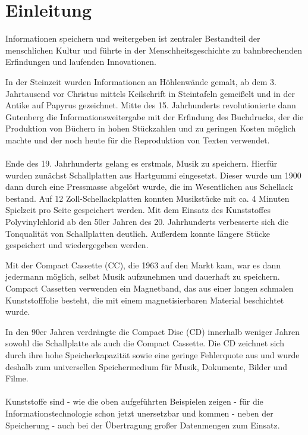 \section{Einleitung}

Informationen speichern und weitergeben ist zentraler Bestandteil der menschlichen Kultur und führte 
in der Menschheitsgeschichte zu bahnbrechenden Erfindungen und laufenden Innovationen.

In der Steinzeit wurden Informationen an Höhlenwände gemalt, ab dem 3. Jahrtausend vor Christus
mittels Keilschrift in Steintafeln gemeißelt und in der Antike auf Papyrus gezeichnet. Mitte
des 15. Jahrhunderts revolutionierte dann Gutenberg die Informationsweitergabe mit der Erfindung des
Buchdrucks, der die Produktion von Büchern in hohen Stückzahlen und zu geringen Kosten möglich
machte und der noch heute für die Reproduktion von Texten verwendet.

\paragraph{}
Ende des 19. Jahrhunderts gelang es erstmals, Musik zu speichern. Hierfür wurden zunächst
Schallplatten aus Hartgummi eingesetzt. Dieser wurde um 1900 dann durch eine Pressmasse abgelöst
wurde, die im Wesentlichen aus Schellack bestand. Auf 12 Zoll-Schellackplatten konnten Musikstücke
mit ca. 4 Minuten Spielzeit pro Seite gespeichert werden. Mit dem Einsatz des Kunststoffes
Polyvinylchlorid ab den 50er Jahren des 20. Jahrhunderts verbesserte sich die Tonqualität von
Schallplatten deutlich. Außerdem konnte längere Stücke gespeichert und wiedergegeben werden.
\cite{schallplatte1}

Mit der Compact Cassette (CC), die 1963 auf den Markt kam, war es dann jedermann möglich, selbst
Musik aufzunehmen und dauerhaft zu speichern. Compact Cassetten verwenden ein Magnetband, das aus
einer langen schmalen Kunststofffolie besteht, die mit einem magnetisierbaren Material beschichtet
wurde. \cite{kassette1} \cite{kassette2}

In den 90er Jahren verdrängte  die Compact Disc (CD) innerhalb weniger Jahren sowohl die
Schallplatte als auch die Compact Cassette. Die CD zeichnet sich durch ihre hohe Speicherkapazität
sowie eine geringe Fehlerquote aus und wurde deshalb zum universellen Speichermedium für Musik, Dokumente,
Bilder und Filme. \cite{cd_durchbruch}

\paragraph{}
Kunststoffe sind - wie die oben aufgeführten Beispielen zeigen - für die Informationstechnologie
schon jetzt unersetzbar und kommen - neben der Speicherung - auch bei der Übertragung großer
Datenmengen zum Einsatz.

